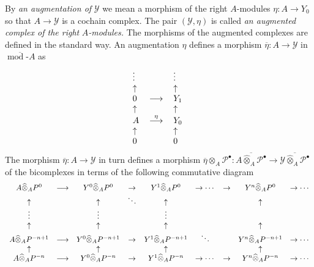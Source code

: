 \documentclass[12pt]{amsart}%
\theoremstyle{plain}
\numberwithin{equation}{section}
\numberwithin{equation}{section}
\numberwithin{theorem}{section}
\numberwithin{lemma}{section}
\numberwithin{remark}{section}
\numberwithin{example}{section}
\numberwithin{proposition}{section}
\numberwithin{definition}{section}
\numberwithin{corollary}{section}
\begin{document}
By \textit{an augmentation of} $\mathcal{Y}$ we mean a morphism of the right
$A$-modules $\eta:A\rightarrow Y_{0}$ so that $A\rightarrow\mathcal{Y}$ is a
cochain complex. The pair $\left(  \mathcal{Y},\eta\right)  $ is called
\textit{an augmented complex of the right }$A$\textit{-modules.} The morphisms
of the augmented complexes are defined in the standard way. An augmentation
$\eta$ defines a morphism $\overline{\eta}:A\rightarrow\mathcal{Y}$ in
$\overline{\operatorname*{mod}\text{-}A}$ as%
\[%
\begin{tabular}
[c]{lll}%
$\vdots$ &  & $\vdots$\\
$\uparrow$ &  & $\uparrow$\\
$0$ & $\longrightarrow$ & $Y_{1}$\\
$\uparrow$ &  & $\uparrow$\\
$A$ & $\overset{\eta}{\longrightarrow}$ & $Y_{0}$\\
$\uparrow$ &  & $\uparrow$\\
$0$ &  & $0$%
\end{tabular}
\
\]
The morphism $\overline{\eta}:A\rightarrow\mathcal{Y}$ in turn defines a
morphism $\overline{\eta}\otimes_{A}\mathcal{P}^{\bullet}:\overline
{A\widehat{\otimes}_{A}\mathcal{P}^{\bullet}}\longrightarrow\overline
{\mathcal{Y}\widehat{\otimes}_{A}\mathcal{P}^{\bullet}}$ of the bicomplexes in
terms of the following commutative diagram%
\[%
\begin{array}
[c]{ccccccccc}%
A\widehat{\otimes}_{A}P^{0} & \longrightarrow & Y^{0}\widehat{\otimes}%
_{A}P^{0} & \rightarrow & Y^{1}\widehat{\otimes}_{A}P^{0} & \rightarrow\cdots
& \rightarrow & Y^{n}\widehat{\otimes}_{A}P^{0} & \rightarrow\cdots\\
\uparrow &  & \uparrow & \ddots & \uparrow &  &  & \uparrow & \\
\vdots &  & \vdots &  & \vdots &  &  &  & \\
\uparrow &  & \uparrow &  & \uparrow &  &  & \uparrow & \\
A\widehat{\otimes}_{A}P^{-n+1} & \longrightarrow & Y^{0}\widehat{\otimes}%
_{A}P^{-n+1} & \rightarrow & Y^{1}\widehat{\otimes}_{A}P^{-n+1} & \ddots &  &
Y^{n}\widehat{\otimes}_{A}P^{-n+1} & \rightarrow\cdots\\
\uparrow &  & \uparrow &  & \uparrow &  &  & \uparrow & \\
A\widehat{\otimes}_{A}P^{-n} & \longrightarrow & Y^{0}\widehat{\otimes}%
_{A}P^{-n} & \rightarrow & Y^{1}\widehat{\otimes}_{A}P^{-n} & \rightarrow
\cdots & \rightarrow & Y^{n}\widehat{\otimes}_{A}P^{-n} & \rightarrow\cdots
\end{array}
\]
\end{document}

